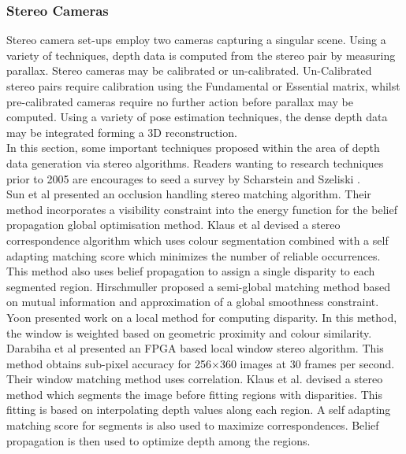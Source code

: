\subsubsection{Stereo Cameras}

\label{StereoMethodsSection}

Stereo camera set-ups employ two cameras capturing a singular scene. Using a variety of techniques, depth data is computed from the stereo pair by measuring parallax. Stereo cameras may be calibrated or un-calibrated. Un-Calibrated stereo pairs require calibration using the Fundamental or Essential matrix, whilst pre-calibrated cameras require no further action before parallax may be computed. Using a variety of pose estimation techniques, the dense depth data may be integrated forming a 3D reconstruction. \\

In this section, some important techniques proposed within the area of depth data generation via stereo algorithms. Readers wanting to research techniques prior to 2005 are encourages to seed a survey by Scharstein and Szeliski \cite{Scharstein02Taxonomy}. \\


Sun et al \cite{Sun05Symmetric} presented an occlusion handling stereo matching algorithm. Their method incorporates a visibility constraint into the energy function for the belief propagation global optimisation method. Klaus et al \cite{Klaus06Segment} devised a stereo correspondence algorithm which uses colour segmentation combined with a self adapting matching score which minimizes the number of reliable occurrences. This method also uses belief propagation to assign a single disparity to each segmented region. Hirschmuller \cite{Hirschmuller05Accurate} proposed a semi-global matching method based on mutual information and approximation of a global smoothness constraint. \\

Yoon \cite{Yoon06Adaptive} presented work on a local method for computing disparity. In this method, the window is weighted based on geometric proximity and colour similarity. Darabiha et al \cite{Darabiha06Reconfigurable} presented an FPGA based local window stereo algorithm. This method obtains sub-pixel accuracy for 256$\times$360 images at 30 frames per second. Their window matching method uses correlation. Klaus et al. \cite{Klaus06Segment} devised a stereo method which segments the image before fitting regions with disparities. This fitting is based on interpolating depth values along each region. A self adapting matching score for segments is also used to maximize correspondences. Belief propagation is then used to optimize depth among the regions. \\


